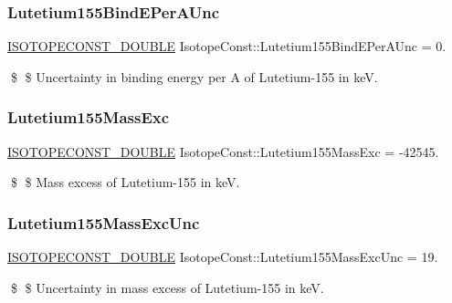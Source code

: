 \subsubsection{\texorpdfstring{Lutetium155\+Bind\+E\+Per\+A\+Unc}{Lutetium155BindEPerAUnc}}
{\footnotesize\ttfamily \mbox{\hyperlink{group___isotope_const-_macros_ga8f45a7272ce02c0b4c65c44636ed719a}{I\+S\+O\+T\+O\+P\+E\+C\+O\+N\+S\+T\+\_\+\+D\+O\+U\+B\+LE}} Isotope\+Const\+::\+Lutetium155\+Bind\+E\+Per\+A\+Unc = 0.}

\$ \$ Uncertainty in binding energy per A of Lutetium-\/155 in keV. \mbox{\label{group___isotope_const-_lutetium-_lu155_ga3957cb64295f9058a6ee65eabe823d5b}} 
\subsubsection{\texorpdfstring{Lutetium155\+Mass\+Exc}{Lutetium155MassExc}}
{\footnotesize\ttfamily \mbox{\hyperlink{group___isotope_const-_macros_ga8f45a7272ce02c0b4c65c44636ed719a}{I\+S\+O\+T\+O\+P\+E\+C\+O\+N\+S\+T\+\_\+\+D\+O\+U\+B\+LE}} Isotope\+Const\+::\+Lutetium155\+Mass\+Exc = -\/42545.}

\$ \$ Mass excess of Lutetium-\/155 in keV. \mbox{\label{group___isotope_const-_lutetium-_lu155_gad2b14315d37afb8dee50908d12f25011}} 
\subsubsection{\texorpdfstring{Lutetium155\+Mass\+Exc\+Unc}{Lutetium155MassExcUnc}}
{\footnotesize\ttfamily \mbox{\hyperlink{group___isotope_const-_macros_ga8f45a7272ce02c0b4c65c44636ed719a}{I\+S\+O\+T\+O\+P\+E\+C\+O\+N\+S\+T\+\_\+\+D\+O\+U\+B\+LE}} Isotope\+Const\+::\+Lutetium155\+Mass\+Exc\+Unc = 19.}

\$ \$ Uncertainty in mass excess of Lutetium-\/155 in keV. \mbox{\label{group___isotope_const-_lutetium-_lu155_gacd173599ce0fbdc053cfd8737d491df0}} 
